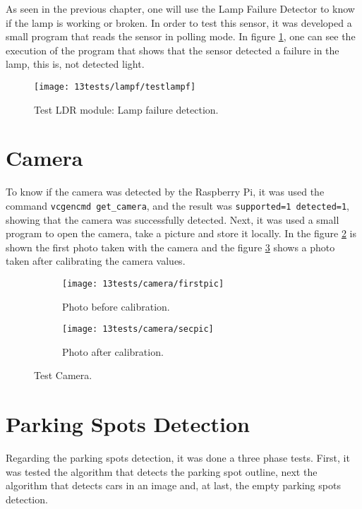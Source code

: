 As seen in the previous chapter, one will use the Lamp Failure Detector to know if the lamp is working or broken. In order to test this sensor, it was developed a small program that reads the sensor in polling mode. In figure \ref{fig:testlampf}, one can see the execution of the program that shows that the sensor detected a failure in the lamp, this is, not detected light.

\begin{figure}[H]
	\centering	
	\texttt{[image: 13tests/lampf/testlampf]}
	\caption{Test LDR module: Lamp failure detection.}
	\label{fig:testlampf}
\end{figure}

\section{Camera}

To know if the camera was detected by the Raspberry Pi, it was used the command \verb|vcgencmd get_camera|, and the result was \verb|supported=1 detected=1|, showing that the camera was successfully detected. Next, it was used a small program to open the camera, take a picture and store it locally. In the figure \ref{fig:firstpic} is shown the first photo taken with the camera and the figure \ref{fig:secpic} shows a photo taken after calibrating the camera values.

\begin{figure}[H]
	\centering
	\begin{subfigure}{.4\textwidth}
		\centering
		\texttt{[image: 13tests/camera/firstpic]}
		\caption{Photo before calibration.}
		\label{fig:firstpic}
	\end{subfigure}%
	\begin{subfigure}{.4\textwidth}
		\centering
		\texttt{[image: 13tests/camera/secpic]}
		\caption{Photo after calibration.}
		\label{fig:secpic}
	\end{subfigure}
	\caption{Test Camera.}
	\label{fig:pics}
\end{figure}

\section{Parking Spots Detection}

Regarding the parking spots detection, it was done a three phase tests. First, it was tested the algorithm that detects the parking spot outline, next the algorithm that detects cars in an image and, at last, the empty parking spots detection.

